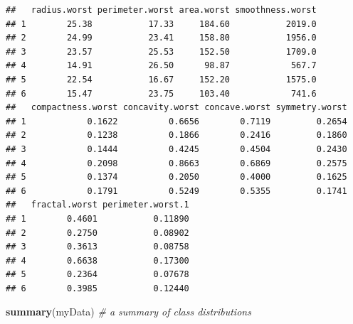 \documentclass[]{article}
\newenvironment{Shaded}{\begin{snugshade}}{\end{snugshade}}
\newcommand{\CommentTok}[1]{\textcolor[rgb]{0.56,0.35,0.01}{\textit{#1}}}
\newcommand{\KeywordTok}[1]{\textcolor[rgb]{0.13,0.29,0.53}{\textbf{#1}}}
\newcommand{\NormalTok}[1]{#1}
\begin{document}
\begin{verbatim}
##   radius.worst perimeter.worst area.worst smoothness.worst
## 1        25.38           17.33     184.60           2019.0
## 2        24.99           23.41     158.80           1956.0
## 3        23.57           25.53     152.50           1709.0
## 4        14.91           26.50      98.87            567.7
## 5        22.54           16.67     152.20           1575.0
## 6        15.47           23.75     103.40            741.6
##   compactness.worst concavity.worst concave.worst symmetry.worst
## 1            0.1622          0.6656        0.7119         0.2654
## 2            0.1238          0.1866        0.2416         0.1860
## 3            0.1444          0.4245        0.4504         0.2430
## 4            0.2098          0.8663        0.6869         0.2575
## 5            0.1374          0.2050        0.4000         0.1625
## 6            0.1791          0.5249        0.5355         0.1741
##   fractal.worst perimeter.worst.1
## 1        0.4601           0.11890
## 2        0.2750           0.08902
## 3        0.3613           0.08758
## 4        0.6638           0.17300
## 5        0.2364           0.07678
## 6        0.3985           0.12440
\end{verbatim}

\begin{Shaded}
\begin{Highlighting}[]
\KeywordTok{summary}\NormalTok{(myData) }\CommentTok{# a summary of class distributions}
\end{Highlighting}
\end{Shaded}
\end{document}
